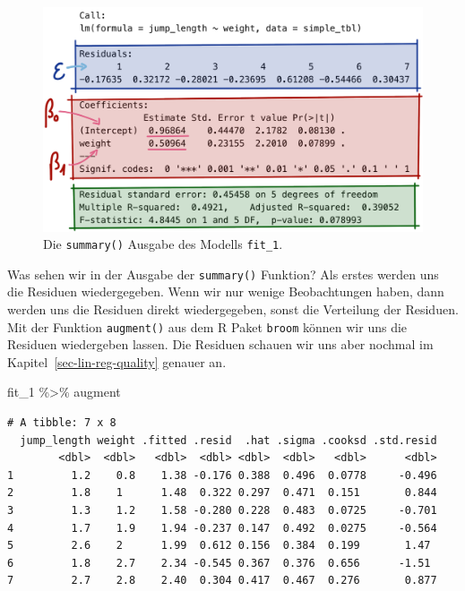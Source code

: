 \documentclass[
  letterpaper,
]{scrbook}
\newenvironment{Shaded}{\begin{snugshade}}{\end{snugshade}}
\newcommand{\NormalTok}[1]{\textcolor[rgb]{0.00,0.23,0.31}{#1}}
\newcommand{\SpecialCharTok}[1]{\textcolor[rgb]{0.37,0.37,0.37}{#1}}
\begin{document}
\begin{figure}

{\centering \includegraphics[width=1\textwidth,height=\textheight]{./images/statistical_modeling_3.png}

}

\caption{\label{fig-lin-reg-3}Die \texttt{summary()} Ausgabe des Modells
\texttt{fit\_1}.}

\end{figure}

Was sehen wir in der Ausgabe der \texttt{summary()} Funktion? Als erstes
werden uns die Residuen wiedergegeben. Wenn wir nur wenige Beobachtungen
haben, dann werden uns die Residuen direkt wiedergegeben, sonst die
Verteilung der Residuen. Mit der Funktion \texttt{augment()} aus dem R
Paket \texttt{broom} können wir uns die Residuen wiedergeben lassen. Die
Residuen schauen wir uns aber nochmal im
Kapitel~\ref{sec-lin-reg-quality} genauer an.

\begin{Shaded}
\begin{Highlighting}[]
\NormalTok{fit\_1 }\SpecialCharTok{\%\textgreater{}\%}\NormalTok{ augment}
\end{Highlighting}
\end{Shaded}

\begin{verbatim}
# A tibble: 7 x 8
  jump_length weight .fitted .resid  .hat .sigma .cooksd .std.resid
        <dbl>  <dbl>   <dbl>  <dbl> <dbl>  <dbl>   <dbl>      <dbl>
1         1.2    0.8    1.38 -0.176 0.388  0.496  0.0778     -0.496
2         1.8    1      1.48  0.322 0.297  0.471  0.151       0.844
3         1.3    1.2    1.58 -0.280 0.228  0.483  0.0725     -0.701
4         1.7    1.9    1.94 -0.237 0.147  0.492  0.0275     -0.564
5         2.6    2      1.99  0.612 0.156  0.384  0.199       1.47 
6         1.8    2.7    2.34 -0.545 0.367  0.376  0.656      -1.51 
7         2.7    2.8    2.40  0.304 0.417  0.467  0.276       0.877
\end{verbatim}
\end{document}
